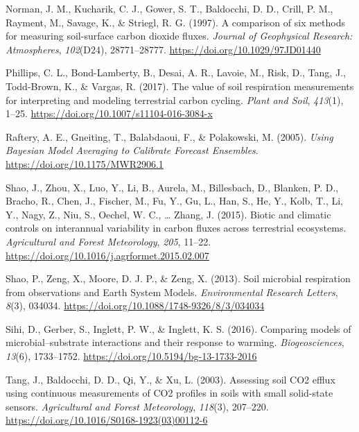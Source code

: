\documentclass[
  letterpaper,
  DIV=11,
  numbers=noendperiod]{scrartcl}
\newlength{\cslhangindent}
\newenvironment{CSLReferences}[2] %
 {\begin{list}{}{%
  \setlength{\itemindent}{0pt}
  \setlength{\leftmargin}{0pt}
  \setlength{\parsep}{0pt}
  \ifodd #1
   \setlength{\leftmargin}{\cslhangindent}
   \setlength{\itemindent}{-1\cslhangindent}
  \fi
  \setlength{\itemsep}{#2\baselineskip}}}
 {\end{list}}
\begin{document}
\begin{CSLReferences}{1}{0}
Norman, J. M., Kucharik, C. J., Gower, S. T., Baldocchi, D. D., Crill,
P. M., Rayment, M., Savage, K., \& Striegl, R. G. (1997). A comparison
of six methods for measuring soil-surface carbon dioxide fluxes.
\emph{Journal of Geophysical Research: Atmospheres}, \emph{102}(D24),
28771--28777. \url{https://doi.org/10.1029/97JD01440}

Phillips, C. L., Bond-Lamberty, B., Desai, A. R., Lavoie, M., Risk, D.,
Tang, J., Todd-Brown, K., \& Vargas, R. (2017). The value of soil
respiration measurements for interpreting and modeling terrestrial
carbon cycling. \emph{Plant and Soil}, \emph{413}(1), 1--25.
\url{https://doi.org/10.1007/s11104-016-3084-x}

Raftery, A. E., Gneiting, T., Balabdaoui, F., \& Polakowski, M. (2005).
\emph{Using {Bayesian Model Averaging} to {Calibrate Forecast
Ensembles}}. \url{https://doi.org/10.1175/MWR2906.1}

Shao, J., Zhou, X., Luo, Y., Li, B., Aurela, M., Billesbach, D.,
Blanken, P. D., Bracho, R., Chen, J., Fischer, M., Fu, Y., Gu, L., Han,
S., He, Y., Kolb, T., Li, Y., Nagy, Z., Niu, S., Oechel, W. C., \ldots{}
Zhang, J. (2015). Biotic and climatic controls on interannual
variability in carbon fluxes across terrestrial ecosystems.
\emph{Agricultural and Forest Meteorology}, \emph{205}, 11--22.
\url{https://doi.org/10.1016/j.agrformet.2015.02.007}

Shao, P., Zeng, X., Moore, D. J. P., \& Zeng, X. (2013). Soil microbial
respiration from observations and {Earth System Models}.
\emph{Environmental Research Letters}, \emph{8}(3), 034034.
\url{https://doi.org/10.1088/1748-9326/8/3/034034}

Sihi, D., Gerber, S., Inglett, P. W., \& Inglett, K. S. (2016).
Comparing models of microbial--substrate interactions and their response
to warming. \emph{Biogeosciences}, \emph{13}(6), 1733--1752.
\url{https://doi.org/10.5194/bg-13-1733-2016}

Tang, J., Baldocchi, D. D., Qi, Y., \& Xu, L. (2003). Assessing soil
{CO2} efflux using continuous measurements of {CO2} profiles in soils
with small solid-state sensors. \emph{Agricultural and Forest
Meteorology}, \emph{118}(3), 207--220.
\url{https://doi.org/10.1016/S0168-1923(03)00112-6}


\end{CSLReferences}
\end{document}
